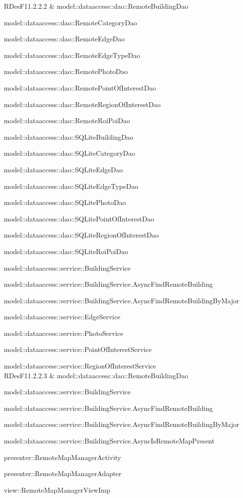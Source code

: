 \documentclass[../DefinizioneDiProdotto.tex]{subfiles}
\begin{document}
\begin{longtabu}
RDesF11.2.2.2 & model::\-dataaccess::\-dao::\-RemoteBuildingDao \par model::\-dataaccess::\-dao::\-RemoteCategoryDao \par model::\-dataaccess::\-dao::\-RemoteEdgeDao \par model::\-dataaccess::\-dao::\-RemoteEdgeTypeDao \par model::\-dataaccess::\-dao::\-RemotePhotoDao \par model::\-dataaccess::\-dao::\-RemotePointOfInterestDao \par model::\-dataaccess::\-dao::\-RemoteRegionOfInterestDao \par model::\-dataaccess::\-dao::\-RemoteRoiPoiDao \par model::\-dataaccess::\-dao::\-SQLiteBuildingDao \par model::\-dataaccess::\-dao::\-SQLiteCategoryDao \par model::\-dataaccess::\-dao::\-SQLiteEdgeDao \par model::\-dataaccess::\-dao::\-SQLiteEdgeTypeDao \par model::\-dataaccess::\-dao::\-SQLitePhotoDao \par model::\-dataaccess::\-dao::\-SQLitePointOfInterestDao \par model::\-dataaccess::\-dao::\-SQLiteRegionOfInterestDao \par model::\-dataaccess::\-dao::\-SQLiteRoiPoiDao \par model::\-dataaccess::\-service::\-BuildingService \par model::\-dataaccess::\-service::\-BuildingService.AsyncFindRemoteBuilding \par model::\-dataaccess::\-service::\-BuildingService.AsyncFindRemoteBuildingByMajor \par model::\-dataaccess::\-service::\-EdgeService \par model::\-dataaccess::\-service::\-PhotoService \par model::\-dataaccess::\-service::\-PointOfInterestService \par model::\-dataaccess::\-service::\-RegionOfInterestService \\ 
\midrule 
RDesF11.2.2.3 & model::\-dataaccess::\-dao::\-RemoteBuildingDao \par model::\-dataaccess::\-service::\-BuildingService \par model::\-dataaccess::\-service::\-BuildingService.AsyncFindRemoteBuilding \par model::\-dataaccess::\-service::\-BuildingService.AsyncFindRemoteBuildingByMajor \par model::\-dataaccess::\-service::\-BuildingService.AsyncIsRemoteMapPresent \par presenter::\-RemoteMapManagerActivity \par presenter::\-RemoteMapManagerAdapter \par view::\-RemoteMapManagerViewImp \\ 

\end{longtabu}
\end{document}
